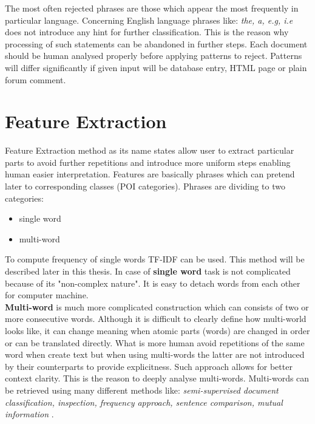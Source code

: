 The most often rejected phrases are those which appear the most frequently in particular language. Concerning English language phrases like: \textit{the, a, e.g, i.e} does not introduce any hint for further classification. This is the reason why processing of such statements can be abandoned in further steps. Each document should be human analysed properly before applying patterns to reject. Patterns will differ significantly if given input will be database entry, HTML page or plain forum comment.

\section{Feature Extraction}

Feature Extraction method as its name states allow user to extract particular parts to avoid further repetitions and introduce more uniform steps enabling human easier interpretation. Features are basically phrases which can pretend later to corresponding classes (POI categories). Phrases are dividing to two categories:
\begin{itemize}
	\item single word
	\item multi-word
\end{itemize}
To compute frequency of single words TF-IDF \cite{wiki_a}\cite{3} can be used. This method will be described later in this thesis. In case of \textbf{single word} task is not complicated because of its "non-complex nature". It is easy to detach words from each other for computer machine.
\\ \newline\textbf{Multi-word} is much more complicated construction which can consists of two or more consecutive words. Although it is difficult to clearly define how multi-world looks like, it can change meaning when atomic parts (words) are changed in order or can be translated directly. What is more human avoid repetitions of the same word when create text but when using multi-words the latter are not introduced by their counterparts to provide explicitness. Such approach allows for better context clarity. This is the reason to deeply analyse multi-words. Multi-words can be retrieved using many different methods like: \textit{semi-supervised document classification, inspection, frequency approach, sentence comparison, mutual information} \cite{1}.

